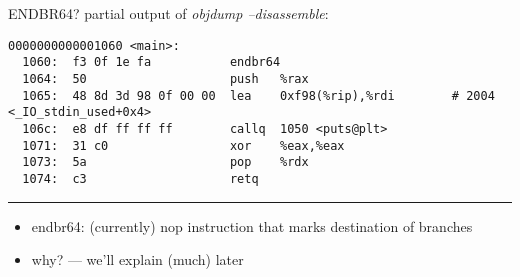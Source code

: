 \begin{frame}[fragile,label=endbr64]{ENDBR64?}
partial output of \textit{objdump --disassemble}:
\begin{Verbatim}[fontsize=\small]
0000000000001060 <main>:
  1060:  f3 0f 1e fa           endbr64 
  1064:  50                    push   %rax
  1065:  48 8d 3d 98 0f 00 00  lea    0xf98(%rip),%rdi        # 2004 <_IO_stdin_used+0x4>
  106c:  e8 df ff ff ff        callq  1050 <puts@plt>
  1071:  31 c0                 xor    %eax,%eax
  1073:  5a                    pop    %rdx
  1074:  c3                    retq   
\end{Verbatim}
\hrule
\begin{itemize}
\item endbr64: (currently) nop instruction that marks destination of branches
\item why? --- we'll explain (much) later
\end{itemize}
\end{frame}
